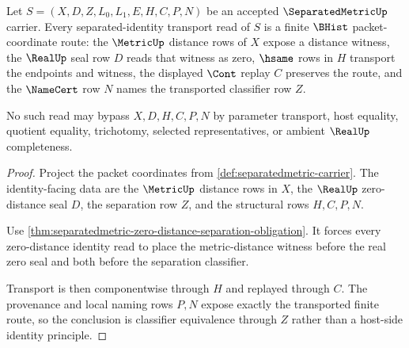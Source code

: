 \begin{theorem}
\label{thm:separatedmetric-separated-identity-transport-obligation}
Let $S=(X,D,Z,L_0,L_1,E,H,C,P,N)$ be an accepted $\SeparatedMetricUp$ carrier. Every separated-identity transport read of $S$ is a finite $\BHist$ packet-coordinate route: the $\MetricUp$ distance rows of $X$ expose a distance witness, the $\RealUp$ seal row $D$ reads that witness as zero, $\hsame$ rows in $H$ transport the endpoints and witness, the displayed $\Cont$ replay $C$ preserves the route, and the $\NameCert$ row $N$ names the transported classifier row $Z$.

No such read may bypass $X,D,H,C,P,N$ by parameter transport, host equality, quotient equality, trichotomy, selected representatives, or ambient $\RealUp$ completeness.
\end{theorem}
\begin{proof}
Project the packet coordinates from \autoref{def:separatedmetric-carrier}. The identity-facing data are the $\MetricUp$ distance rows in $X$, the $\RealUp$ zero-distance seal $D$, the separation row $Z$, and the structural rows $H,C,P,N$.

Use \autoref{thm:separatedmetric-zero-distance-separation-obligation}. It forces every zero-distance identity read to place the metric-distance witness before the real zero seal and both before the separation classifier.

Transport is then componentwise through $H$ and replayed through $C$. The provenance and local naming rows $P,N$ expose exactly the transported finite route, so the conclusion is classifier equivalence through $Z$ rather than a host-side identity principle.
\end{proof}

